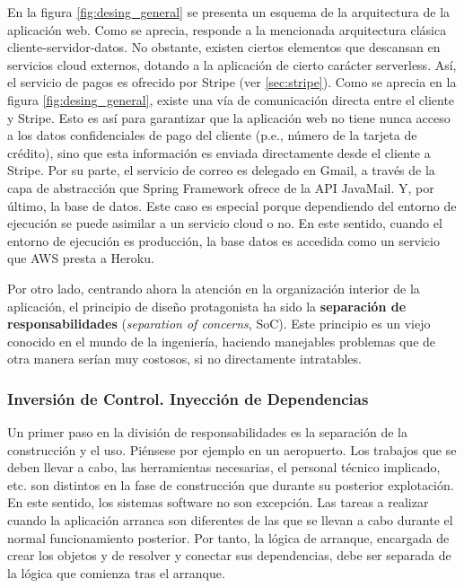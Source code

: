 \documentclass[a4paper]{article}
\begin{document}
    En la figura \ref{fig:desing_general} se presenta un esquema de la arquitectura de la aplicación web. Como se aprecia, responde a la mencionada arquitectura clásica cliente-servidor-datos. No obstante, existen ciertos elementos que descansan en servicios cloud externos, dotando a la aplicación de cierto carácter serverless. Así, el servicio de pagos es ofrecido por Stripe (ver \ref{sec:stripe}). Como se aprecia en la figura \ref{fig:desing_general}, existe una vía de comunicación directa entre el cliente y Stripe. Esto es así para garantizar que la aplicación web no tiene nunca acceso a los datos confidenciales de pago del cliente (p.e., número de la tarjeta de crédito), sino que esta información es enviada directamente desde el cliente a Stripe. Por su parte, el servicio de correo es delegado en Gmail, a través de la capa de abstracción que Spring Framework ofrece de la API JavaMail. Y, por último, la base de datos. Este caso es especial porque dependiendo del entorno de ejecución se puede asimilar a un servicio cloud o no. En este sentido, cuando el entorno de ejecución es producción, la base datos es accedida como un servicio que AWS presta a Heroku.
        
    Por otro lado, centrando ahora la atención en la organización interior de la aplicación, el principio de diseño protagonista ha sido la \textbf{separación de responsabilidades} (\emph{separation of concerns}, SoC). Este principio es un viejo conocido en el mundo de la ingeniería, haciendo manejables problemas que de otra manera serían muy costosos, si no directamente intratables.
    
    
    \subsubsection{Inversión de Control. Inyección de Dependencias} \label{sec:ioc}
    Un primer paso en la división de responsabilidades es la separación de la construcción y el uso. Piénsese por ejemplo en un aeropuerto. Los trabajos que se deben llevar a cabo, las herramientas necesarias, el personal técnico implicado, etc. son distintos en la fase de construcción que durante su posterior explotación. En este sentido, los sistemas software no son excepción. Las tareas a realizar cuando la aplicación arranca son diferentes de las que se llevan a cabo durante el normal funcionamiento posterior. Por tanto, la lógica de arranque, encargada de crear los objetos y de resolver y conectar sus dependencias, debe ser separada de la lógica que comienza tras el arranque.
    
\end{document}

